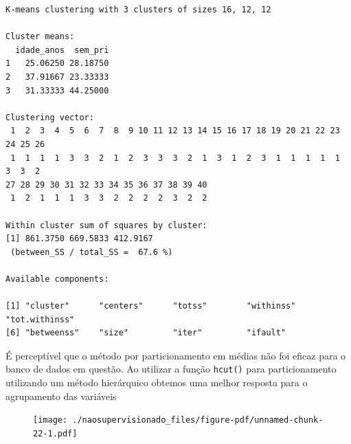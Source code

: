 \documentclass[
  letterpaper,
  DIV=11,
  numbers=noendperiod]{scrreprt}
\newenvironment{Shaded}{\begin{snugshade}}{\end{snugshade}}
\newcommand{\AttributeTok}[1]{\textcolor[rgb]{0.40,0.45,0.13}{#1}}
\newcommand{\DecValTok}[1]{\textcolor[rgb]{0.68,0.00,0.00}{#1}}
\newcommand{\FunctionTok}[1]{\textcolor[rgb]{0.28,0.35,0.67}{#1}}
\newcommand{\NormalTok}[1]{\textcolor[rgb]{0.00,0.23,0.31}{#1}}
\newcommand{\OtherTok}[1]{\textcolor[rgb]{0.00,0.23,0.31}{#1}}
\newcommand{\SpecialCharTok}[1]{\textcolor[rgb]{0.37,0.37,0.37}{#1}}
\newcommand{\StringTok}[1]{\textcolor[rgb]{0.13,0.47,0.30}{#1}}
\begin{document}
\begin{verbatim}
K-means clustering with 3 clusters of sizes 16, 12, 12

Cluster means:
  idade_anos  sem_pri
1   25.06250 28.18750
2   37.91667 23.33333
3   31.33333 44.25000

Clustering vector:
 1  2  3  4  5  6  7  8  9 10 11 12 13 14 15 16 17 18 19 20 21 22 23 24 25 26 
 1  1  1  1  3  3  2  1  2  3  3  3  2  1  3  1  2  3  1  1  1  1  1  3  3  2 
27 28 29 30 31 32 33 34 35 36 37 38 39 40 
 1  2  1  1  1  3  3  2  2  2  2  3  2  2 

Within cluster sum of squares by cluster:
[1] 861.3750 669.5833 412.9167
 (between_SS / total_SS =  67.6 %)

Available components:

[1] "cluster"      "centers"      "totss"        "withinss"     "tot.withinss"
[6] "betweenss"    "size"         "iter"         "ifault"      
\end{verbatim}

É perceptível que o método por particionamento em médias não foi eficaz
para o banco de dados em questão. Ao utilizar a função \texttt{hcut()}
para particionamento utilizando um método hierárquico obtemos uma melhor
resposta para o agrupamento das variáveis

\begin{Shaded}
\end{Shaded}

\begin{figure}[H]

{\centering \texttt{[image: ./naosupervisionado\_files/figure-pdf/unnamed-chunk-22-1.pdf]}

}

\end{figure}
\end{document}
